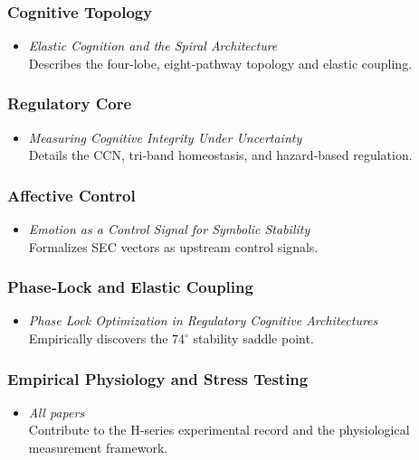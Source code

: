 \documentclass[12pt,a4paper]{report}
\begin{document}
\subsubsection{Cognitive Topology}
\begin{itemize}
\item \textit{Elastic Cognition and the Spiral Architecture} \cite{ElasticCognition2026} \\
  Describes the four‑lobe, eight‑pathway topology and elastic coupling.
\end{itemize}

\subsubsection{Regulatory Core}
\begin{itemize}
\item \textit{Measuring Cognitive Integrity Under Uncertainty} \cite{CognitiveIntegrity2026} \\
  Details the CCN, tri‑band homeostasis, and hazard‑based regulation.
\end{itemize}

\subsubsection{Affective Control}
\begin{itemize}
\item \textit{Emotion as a Control Signal for Symbolic Stability} \cite{EmotionControlSignal2026} \\
  Formalizes SEC vectors as upstream control signals.
\end{itemize}

\subsubsection{Phase‑Lock and Elastic Coupling}
\begin{itemize}
\item \textit{Phase Lock Optimization in Regulatory Cognitive Architectures} \cite{PhaseLockOptimization2026} \\
  Empirically discovers the $74^\circ$ stability saddle point.
\end{itemize}

\subsubsection{Empirical Physiology and Stress Testing}
\begin{itemize}
\item \textit{All papers} \\
  Contribute to the H‑series experimental record and the physiological measurement framework.
\end{itemize}
\end{document}
